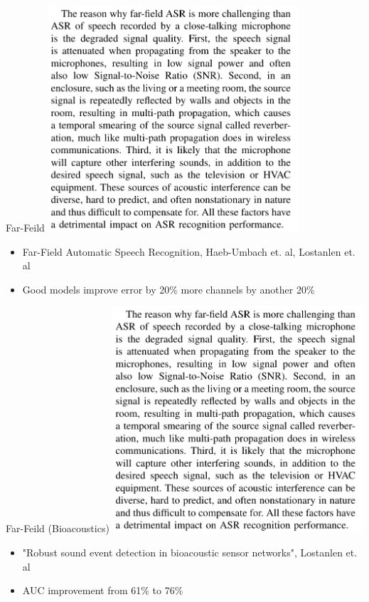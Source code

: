 \begin{frame}{Far-Feild}
    \centering
    \includegraphics[height=0.7\textheight,width=0.7\textwidth,keepaspectratio]{images/FARFIELD.png}
    \begin{itemize}
        \item Far-Field Automatic Speech Recognition, Haeb-Umbach et. al, Lostanlen et. al
        \item Good models improve error by 20\% more channels by another 20\%
    \end{itemize}

\end{frame}

\begin{frame}{Far-Feild (Bioacoustics)}
    \centering
    \includegraphics[height=0.7\textheight,width=0.7\textwidth,keepaspectratio]{images/FARFIELD.png}
    \begin{itemize}
        \item "Robust sound event detection in bioacoustic sensor networks", Lostanlen et. al
        \item AUC improvement from 61\% to 76\%
    \end{itemize}
\end{frame}

